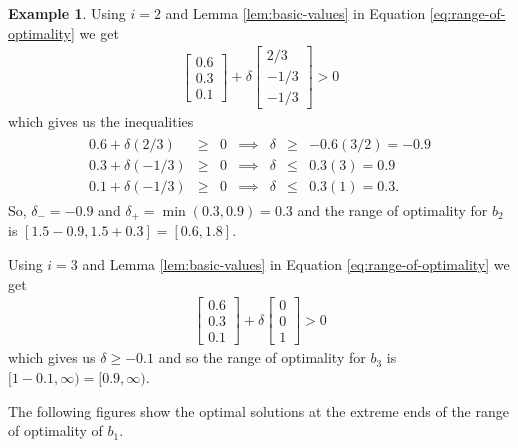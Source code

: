 \documentclass[
]{book}
\theoremstyle{definition}
\theoremstyle{definition}
\newtheorem{example}{Example}[chapter]
\theoremstyle{definition}
\theoremstyle{definition}
\theoremstyle{remark}
\begin{document}
\begin{example}
Using \(i = 2\) and Lemma \ref{lem:basic-values} in Equation \eqref{eq:range-of-optimality} we get
\begin{align*}
  \begin{bmatrix} 0.6 \\ 0.3 \\ 0.1 \end{bmatrix} 
  + \delta
  \begin{bmatrix}
    2/3 \\ 
    -1/3 \\
    -1/3
  \end{bmatrix} > 0
\end{align*}
which gives us the inequalities
\begin{align*}
  \begin{array}{lrlrrll}
    0.6 + \delta (2/3) &\ge& 0 & \implies & \delta &\ge& - 0.6 (3/2) = -0.9 \\
    0.3 + \delta (-1/3) &\ge &0 & \implies & \delta &\le &0.3 (3) = 0.9  \\
    0.1 + \delta (-1/3) &\ge &0 & \implies & \delta & \le& 0.3 (1) = 0.3.  
  \end{array}
\end{align*}
So, \(\delta_- = -0.9\) and \(\delta_+ = \min(0.3, 0.9) = 0.3\) and the range of optimality for \(b_2\) is \([1.5 - 0.9, 1.5 + 0.3] = [0.6, 1.8]\).

Using \(i = 3\) and Lemma \ref{lem:basic-values} in Equation \eqref{eq:range-of-optimality} we get
\begin{align*}
  \begin{bmatrix} 0.6 \\ 0.3 \\ 0.1 \end{bmatrix} 
  + \delta
  \begin{bmatrix}
    0 \\ 
    0 \\
    1
  \end{bmatrix} > 0
\end{align*}
which gives us \(\delta \ge -0.1\) and so the range of optimality for \(b_3\) is \([1 - 0.1, \infty) = [0.9, \infty)\).

The following figures show the optimal solutions at the extreme ends of the range of optimality of \(b_1\).


\end{example}
\end{document}
